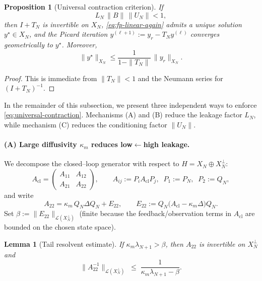 \documentclass[11pt,a4paper]{article}
\numberwithin{equation}{section}
\newtheorem{lemma}[theorem]{Lemma}
\newtheorem{proposition}[theorem]{Proposition}
\theoremstyle{definition}
\newcommand{\1}{\mathbbm{1}}
\begin{document}
\begin{proposition}[Universal contraction criterion]
\label{prop:universal-contraction}
If
\begin{equation}
\label{eq:universal-contraction}
L_N\,\|B\|\,\|U_N\|<1,
\end{equation}
then $I+T_N$ is invertible on $X_N$, \eqref{eq:fp-linear-again} admits a unique solution $y^\star\in X_N$, and the Picard
iteration $y^{(\ell+1)} := y_r - T_N y^{(\ell)}$ converges geometrically to $y^\star$.
Moreover,
\[
\|y^\star\|_{X_N}\le \frac{1}{1-\|T_N\|}\,\|y_r\|_{X_N}.
\]
\end{proposition}

\begin{proof}
This is immediate from $\|T_N\|<1$ and the Neumann series for $(I+T_N)^{-1}$.
\end{proof}
\noindent
In the remainder of this subsection, we present three independent ways to enforce \eqref{eq:universal-contraction}.
Mechanisms (A) and (B) reduce the leakage factor $L_N$, while mechanism (C) reduces the conditioning factor $\|U_N\|$.

\paragraph{(A) Large diffusivity $\kappa_m$ reduces low$\leftarrow$high leakage.}
We decompose the closed--loop generator with respect to $H=X_N\oplus X_N^\perp$:
\[
A_{\mathrm{cl}}
=
\begin{pmatrix}
A_{11} & A_{12}\\
A_{21} & A_{22}
\end{pmatrix},
\qquad
A_{ij}:=P_i A_{\mathrm{cl}} P_j,\;\; P_1:=P_N,\;\; P_2:=Q_N,
\]
and write
\[
A_{22} = \kappa_m\,Q_N\Delta Q_N + E_{22},\qquad E_{22}:=Q_N\bigl(A_{\mathrm{cl}}-\kappa_m\Delta\bigr)Q_N .
\]
Set $\beta:=\|E_{22}\|_{\mathcal{L}(X_N^\perp)}$ (finite because the feedback/observation terms in $A_{\mathrm{cl}}$ are bounded on the chosen state space).

\begin{lemma}[Tail resolvent estimate]
\label{lem:tail-resolvent-kappa}
If $\kappa_m\lambda_{N+1}>\beta$, then $A_{22}$ is invertible on $X_N^\perp$ and
\begin{equation}
\label{eq:tail-inverse}
\|A_{22}^{-1}\|_{\mathcal{L}(X_N^\perp)}
\;\le\;
\frac{1}{\kappa_m\lambda_{N+1}-\beta}.
\end{equation}
\end{lemma}
\end{document}
